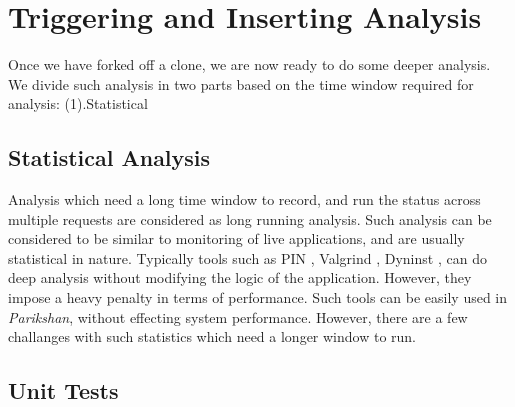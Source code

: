 \section{Triggering and Inserting Analysis}
\label{sec:trigger}

Once we have forked off a clone, we are now ready to do some deeper analysis. 
We divide such analysis in two parts based on the time window required for analysis: (1).Statistical

\subsection{Statistical Analysis}
\label{sec:statisticalTests}

Analysis which need a long time window to record, and run the status across multiple requests are considered as long running analysis. 
Such analysis can be considered to be similar to monitoring of live applications, and are usually statistical in nature.
Typically tools such as PIN \cite{pin}, Valgrind \cite{valgrind}, Dyninst \cite{dyninst}, can do deep analysis without modifying the logic of the application.
However, they impose a heavy penalty in terms of performance.
Such tools can be easily used in \textit{Parikshan}, without effecting system performance.
However, there are a few challanges with such statistics which need a longer window to run.
\subsection{Unit Tests}
\label{sec:unitTests}
